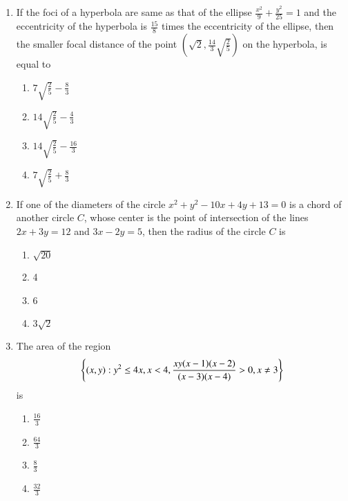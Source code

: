 \documentclass[journal]{IEEEtran}
\begin{document}
\begin{enumerate}
    \item If the foci of a hyperbola are same as that of the ellipse
    $\frac{x^2}{9} + \frac{y^2}{25} = 1$ and the eccentricity of the
    hyperbola is $\frac{15}{8}$ times the eccentricity of the
    ellipse, then the smaller focal distance of the point
    $(\sqrt{2}, \frac{14}{3} \sqrt{\frac{2}{5}})$ on the hyperbola,
    is equal to

    \begin{multicols}{4}
\begin{enumerate}

        \item $7\sqrt{\frac{2}{5}} - \frac{8}{3}$
        \item $14\sqrt{\frac{2}{5}} - \frac{4}{3}$
        \item $14\sqrt{\frac{2}{5}} - \frac{16}{3}$
        \item $7\sqrt{\frac{2}{5}} + \frac{8}{3}$
    \end{enumerate}
\end{multicols}

    \item If one of the diameters of the circle $x^2 + y^2 - 10x +
    4y + 13 = 0$ is a chord of another circle $C$, whose
    center is the point of intersection of the lines $2x +
    3y = 12$ and $3x - 2y = 5$, then the radius of the
    circle $C$ is
    
    \begin{multicols}{4}
\begin{enumerate}

        \item $\sqrt{20}$
        \item 4
        \item 6
        \item $3\sqrt{2}$
    \end{enumerate}
\end{multicols}

    \item The area of the region
    $$
    \left\{(x,y): y^2\le 4x,x<4,\frac{xy(x-1)(x-2)}{(x-3)(x-4)}>0,x\ne3\right\}
    $$
    is

    \begin{multicols}{4}
\begin{enumerate}

        \item $\frac{16}{3}$
        \item $\frac{64}{3}$
        \item $\frac{8}{3}$
        \item $\frac{32}{3}$
    \end{enumerate}
\end{multicols}


\end{enumerate}
\end{document}
